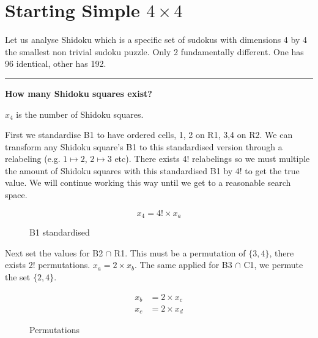 \documentclass[a4paper,11pt]{report}
\newcounter{row}
\newcounter{col}
\newcounter{rowa}
\newcounter{cola}
\newcommand\setrowa[4]{
  \setcounter{cola}{1}
  \foreach \n in {#1, #2, #3, #4} {
    \edef\x{\value{cola} - 0.5}
    \edef\y{4.5 - \value{rowa}}
    \node[anchor=center] at (\x, \y) {\n};
    \stepcounter{cola}
  }
  \stepcounter{rowa}
}
\begin{document}
{\section{Starting Simple $4 \times 4$}
Let us analyse Shidoku which is a specific set of sudokus with dimensions 4 by 4 the smallest non trivial sudoku puzzle. Only 2 fundamentally different. One has 96 identical, other has 192. 

\noindent\rule{4cm}{0.4pt}

\textbf{How many Shidoku squares exist?}

$x_4$ is the number of Shidoku squares.

First we standardise B1 to have ordered cells, 1, 2 on R1, 3,4 on R2. We can transform any Shidoku square's B1 to this standardised version through a relabeling (e.g. $1 \mapsto 2$, $2\mapsto 3$ etc). There exists 4! relabelings so we must multiple the amount of Shidoku squares with this standardised B1 by 4! to get the true value. We will continue working this way until we get to a reasonable search space.

\begin{equation}
x_4 = 4!\times x_a
\end{equation}

\begin{figure}[h]
\centering
{}
\caption{B1 standardised}
\label{fig:shidokurelabelling}
\end{figure}

Next set the values for B2 $\cap$ R1. This must be a permutation of $\{3,4\}$, there exists 2! permutations. $x_a = 2\times x_b$. The same applied for B3 $\cap$ C1, we permute the set $\{2,4\}$. 

\begin{eqnarray}x_b &= 2\times x_c\\ x_c &=2\times x_d\end{eqnarray}
\begin{figure}[h]
\centering
{}
\caption{Permutations}
\label{fig:shidokurelabelling}
\end{figure}

}
\end{document}
